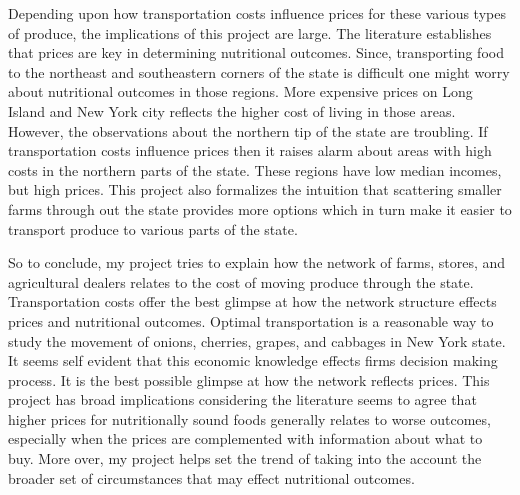 \documentclass{report}
\begin{document}
Depending upon how transportation costs influence prices for these various types of produce, the implications of this project are large. The literature establishes that prices are key in determining nutritional outcomes. Since, transporting food to the northeast and southeastern corners of the state is difficult one might worry about nutritional outcomes in those regions. More expensive prices on Long Island and New York city reflects the higher cost of living in those areas. However, the observations about the northern tip of the state are troubling. If transportation costs influence prices then it raises alarm about areas with high costs in the northern parts of the state. These regions have low median incomes, but high prices. This project also formalizes the intuition that scattering smaller farms through out the state provides more options which in turn make it easier to transport produce to various parts of the state.

So to conclude, my project tries to explain how the network of farms, stores, and agricultural dealers relates to the cost of moving produce through the state. Transportation costs offer the best glimpse at how the network structure effects prices and nutritional outcomes.  Optimal transportation is a reasonable way to study the movement of onions, cherries, grapes, and cabbages in New York state. It seems self evident that this economic knowledge effects firms decision making process. It is the best possible glimpse at how the network reflects prices. This project has broad implications considering the literature seems to agree that higher prices for nutritionally sound foods generally relates to worse outcomes, especially when the prices are complemented with information about what to buy. More over, my project helps set the trend of taking into the account the broader set of circumstances that may effect nutritional outcomes. 



\pagebreak
\end{document}
